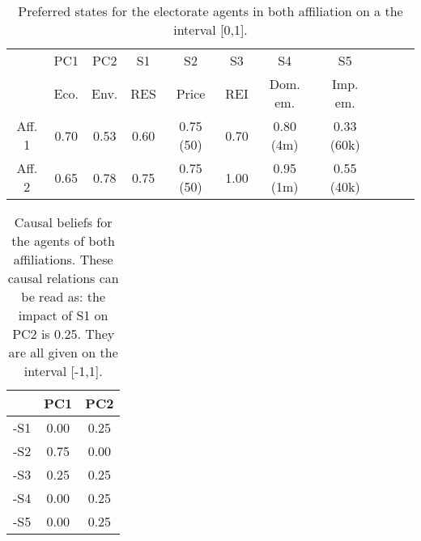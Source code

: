 \documentclass[12pt]{article}
\begin{document}
\begin{table}
\begin{center}
\begin{tabular}{ |c|c|c|c|c|c|c|c|c|c|c| } 
\hline
		
		& PC1 	& PC2	& S1		& S2			& S3		& S4			& S5		\\ 
		& Eco.	& Env.	& RES	& Price		& REI	& Dom. em.	& Imp. em.	\\ \hline \hline
Aff. 1		& 0.70	& 0.53	& 0.60	& 0.75 (50)	& 0.70	& 0.80 (4m)	& 0.33 (60k)	\\ \hline
Aff. 2		& 0.65	& 0.78	& 0.75	& 0.75 (50) 	& 1.00	& 0.95 (1m)	& 0.55 (40k)	\\ 
\hline
\end{tabular}
\end{center}
\caption{Preferred states for the electorate agents in both affiliation on a the interval [0,1].}
\label{tab:preferredStates}
\end{table}


\begin{table}
\begin{center}
\begin{tabular}{ |c|c|c|}
 \hline
 	& PC1	& PC2		\\ \hline \hline
-S1 	& 0.00	& 0.25		\\ \hline
-S2 	& 0.75	& 0.00		\\ \hline
-S3 	& 0.25	& 0.25		\\ \hline
-S4 	& 0.00	& 0.25		\\ \hline
-S5 	& 0.00	& 0.25		\\ 
 \hline
\end{tabular}
\end{center}
\caption{Causal beliefs for the agents of both affiliations. These causal relations can be read as: the impact of S1 on PC2 is 0.25. They are all given on the interval [-1,1].}
\label{tab:causalBeliefs}
\end{table}
\end{document}
